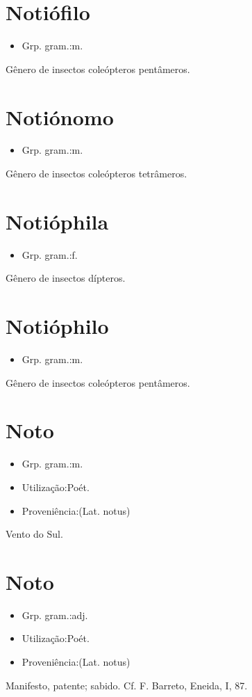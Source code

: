 \section{Notiófilo}
\begin{itemize}
\item {Grp. gram.:m.}
\end{itemize}
Gênero de insectos coleópteros pentâmeros.
\section{Notiónomo}
\begin{itemize}
\item {Grp. gram.:m.}
\end{itemize}
Gênero de insectos coleópteros tetrâmeros.
\section{Notióphila}
\begin{itemize}
\item {Grp. gram.:f.}
\end{itemize}
Gênero de insectos dípteros.
\section{Notióphilo}
\begin{itemize}
\item {Grp. gram.:m.}
\end{itemize}
Gênero de insectos coleópteros pentâmeros.
\section{Noto}
\begin{itemize}
\item {Grp. gram.:m.}
\end{itemize}
\begin{itemize}
\item {Utilização:Poét.}
\end{itemize}
\begin{itemize}
\item {Proveniência:(Lat. \textunderscore notus\textunderscore )}
\end{itemize}
Vento do Sul.
\section{Noto}
\begin{itemize}
\item {Grp. gram.:adj.}
\end{itemize}
\begin{itemize}
\item {Utilização:Poét.}
\end{itemize}
\begin{itemize}
\item {Proveniência:(Lat. \textunderscore notus\textunderscore )}
\end{itemize}
Manifesto, patente; sabido. Cf. F. Barreto, \textunderscore Eneida\textunderscore , I, 87.
